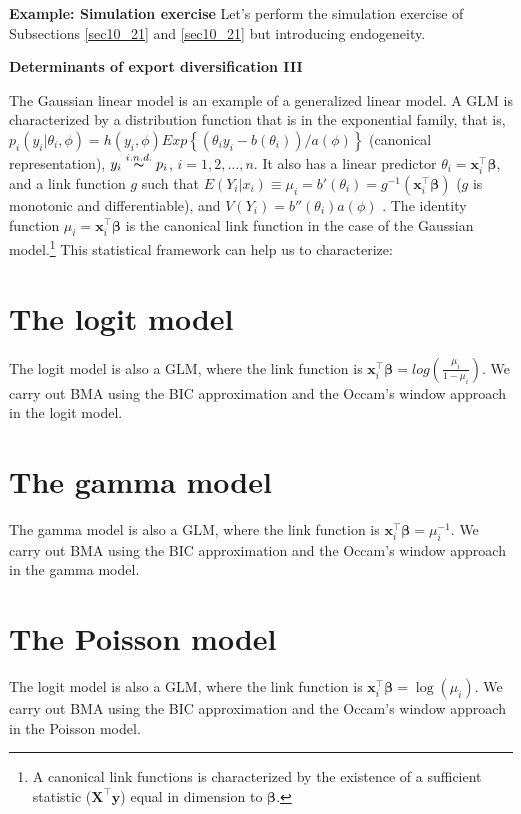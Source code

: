 \textbf{Example: Simulation exercise}
Let's perform the simulation exercise of Subsections \ref{sec10_21} and \ref{sec10_21} but introducing endogeneity. 

\textbf{Determinants of export diversification III} 


The Gaussian linear model is an example of a generalized linear model.
A GLM is characterized by a distribution function that is in the exponential family, that is, $p_i(y_i|\theta_i,\phi)=h(y_i,\phi)Exp\left\{(\theta_iy_i-b(\theta_i))/a(\phi)\right\}$ (canonical representation), $y_i\stackrel{i.n.d.} {\thicksim}p_i$, $i=1,2,\dots,n$.
It also has a linear predictor $\theta_i=\bm{x}_i^{\top}\bm{\beta}$, and a link function $g$ such that $E(Y_i|x_i)\equiv \mu_i=b'(\theta_i)=g^{-1}(\bm{x}_i^{\top}\bm{\beta})$ ($g$ is monotonic and differentiable), and $V(Y_i)=b''(\theta_i)a(\phi)$ \cite{McCullagh1989}.
The identity function $\mu_i=\bm{x}_i^{\top}\bm{\beta}$ is the canonical link function in the case of the Gaussian model.\footnote{A canonical link functions is characterized by the existence of a sufficient statistic ($\bm{X}^{\top}\bm{y}$) equal in dimension to $\bm{\beta}$.} This statistical framework can help us to characterize:

\section{The logit model}\label{sec10_3}

The logit model is also a GLM, where the link function is $\bm{x}_i^{\top}\bm{\beta}=log\left(\frac{\mu_i}{1-\mu_i}\right)$.
We carry out BMA using the BIC approximation and the Occam's window approach in the logit model.

\section{The gamma model}\label{sec10_4}
The gamma model is also a GLM, where the link function is $\bm{x}_i^{\top}\bm{\beta}=\mu_i^{-1}$.
We carry out BMA using the BIC approximation and the Occam's window approach in the gamma model.

\section{The Poisson model}\label{sec10_5}
The logit model is also a GLM, where the link function is $\bm{x}_i^{\top}\bm{\beta}=\log(\mu_i)$.
We carry out BMA using the BIC approximation and the Occam's window approach in the Poisson model.


